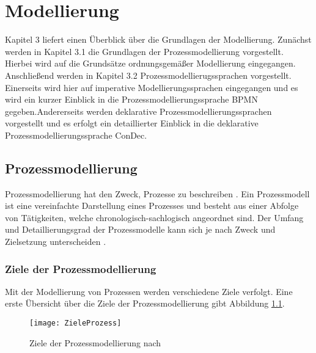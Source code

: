 
\chapter{Modellierung}\label{sec:chapter3}
Kapitel 3 liefert einen Überblick über die Grundlagen der Modellierung. Zunächst werden in Kapitel 3.1 die Grundlagen der Prozessmodellierung vorgestellt. Hierbei wird auf die Grundsätze ordnungsgemäßer Modellierung eingegangen. Anschließend werden in Kapitel 3.2 Prozessmodellierugssprachen vorgestellt. Einerseits wird hier auf imperative Modellierungssprachen eingegangen und es wird ein kurzer Einblick in die Prozessmodellierungssprache BPMN gegeben.Andererseits werden deklarative Prozessmodellierungssprachen vorgestellt und es erfolgt ein detaillierter Einblick in die deklarative Prozessmodellierungssprache ConDec.

\section{Prozessmodellierung}\label{sec:chapter3:Prozessmodellierung}

Prozessmodellierung hat den Zweck, Prozesse zu beschreiben \cite{fahland2009}. Ein Prozessmodell ist eine vereinfachte Darstellung eines Prozesses und besteht aus einer Abfolge von Tätigkeiten, welche chronologisch-sachlogisch angeordnet sind. Der Umfang und Detaillierungsgrad der Prozessmodelle kann sich je nach Zweck und Zielsetzung unterscheiden \cite{koch2011}.

\subsection{Ziele der Prozessmodellierung}
Mit der Modellierung von Prozessen werden verschiedene Ziele verfolgt. Eine erste Übersicht über die Ziele der Prozessmodellierung gibt Abbildung \ref{fig:ZieleProzess}.
\begin{figure}[htp]
\begin{center}
  \texttt{[image: ZieleProzess]} %
  \caption{Ziele der Prozessmodellierung nach \cite{koch2011}}
  \label{fig:ZieleProzess}
\end{center}
\end{figure}

